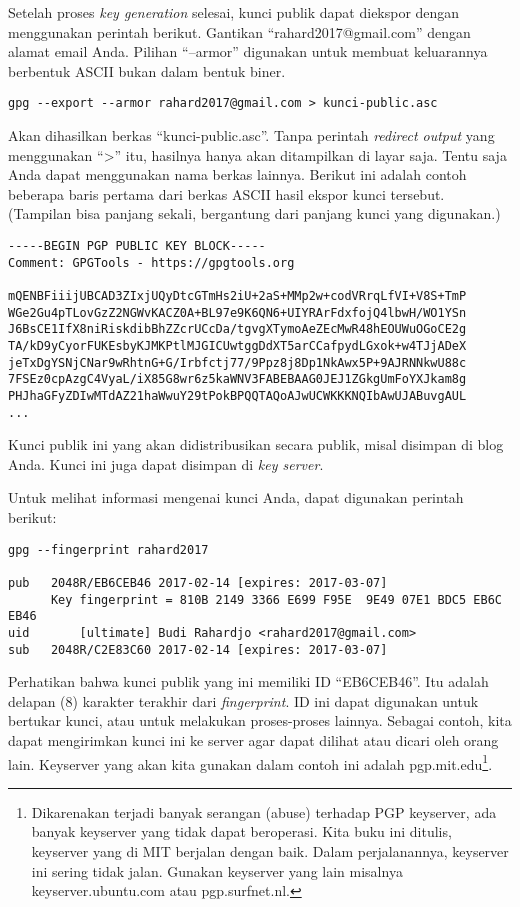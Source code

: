 Setelah proses {\em key generation} selesai, kunci publik dapat diekspor dengan
menggunakan perintah  berikut. Gantikan ``rahard2017@gmail.com'' dengan alamat
email Anda. Pilihan ``--armor'' digunakan untuk membuat keluarannya berbentuk ASCII
bukan dalam bentuk biner.

\begin{verbatim}
gpg --export --armor rahard2017@gmail.com > kunci-public.asc
\end{verbatim}

Akan dihasilkan berkas ``kunci-public.asc''. Tanpa perintah {\em redirect
output} yang menggunakan ``>'' itu, hasilnya hanya akan ditampilkan di layar
saja. Tentu saja Anda dapat menggunakan nama berkas lainnya.
Berikut ini adalah contoh beberapa baris pertama dari berkas ASCII hasil ekspor
kunci tersebut. (Tampilan bisa panjang sekali, bergantung dari panjang kunci
yang digunakan.)

\begin{verbatim}
-----BEGIN PGP PUBLIC KEY BLOCK-----
Comment: GPGTools - https://gpgtools.org

mQENBFiiijUBCAD3ZIxjUQyDtcGTmHs2iU+2aS+MMp2w+codVRrqLfVI+V8S+TmP
WGe2Gu4pTLovGzZ2NGWvKACZ0A+BL97e9K6QN6+UIYRArFdxfojQ4lbwH/WO1YSn
J6BsCE1IfX8niRiskdibBhZZcrUCcDa/tgvgXTymoAeZEcMwR48hEOUWuOGoCE2g
TA/kD9yCyorFUKEsbyKJMKPtlMJGICUwtggDdXT5arCCafpydLGxok+w4TJjADeX
jeTxDgYSNjCNar9wRhtnG+G/Irbfctj77/9Ppz8j8Dp1NkAwx5P+9AJRNNkwU88c
7FSEz0cpAzgC4VyaL/iX85G8wr6z5kaWNV3FABEBAAG0JEJ1ZGkgUmFoYXJkam8g
PHJhaGFyZDIwMTdAZ21haWwuY29tPokBPQQTAQoAJwUCWKKKNQIbAwUJABuvgAUL
...
\end{verbatim}

Kunci publik ini yang akan didistribusikan secara publik, misal disimpan di
blog Anda. Kunci ini juga dapat disimpan di {\em key server}.

Untuk melihat informasi mengenai kunci Anda, dapat digunakan perintah berikut:

\begin{verbatim}
gpg --fingerprint rahard2017

pub   2048R/EB6CEB46 2017-02-14 [expires: 2017-03-07]
      Key fingerprint = 810B 2149 3366 E699 F95E  9E49 07E1 BDC5 EB6C EB46
uid       [ultimate] Budi Rahardjo <rahard2017@gmail.com>
sub   2048R/C2E83C60 2017-02-14 [expires: 2017-03-07]
\end{verbatim}

Perhatikan bahwa kunci publik yang ini memiliki ID ``EB6CEB46''. 
Itu adalah delapan (8) karakter terakhir dari {\em fingerprint}.
ID ini dapat
digunakan untuk bertukar kunci, atau untuk melakukan proses-proses lainnya.
Sebagai contoh, kita dapat mengirimkan kunci ini ke server agar dapat dilihat
atau dicari oleh orang lain. Keyserver yang akan kita gunakan dalam contoh ini
adalah pgp.mit.edu\footnote{Dikarenakan terjadi banyak serangan (abuse)
terhadap PGP keyserver, ada banyak keyserver yang tidak dapat beroperasi.
Kita buku ini ditulis, keyserver yang di MIT berjalan dengan baik. Dalam
perjalanannya, keyserver ini sering tidak jalan. Gunakan keyserver yang lain
misalnya keyserver.ubuntu.com atau pgp.surfnet.nl.}.

